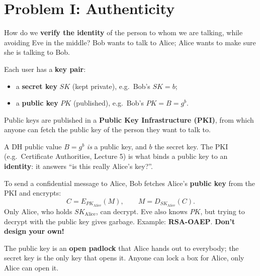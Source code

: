 \section{Problem I: Authenticity}

\begin{defnbox}[title=Authenticity]
How do we \textbf{verify the identity} of the person to whom we are talking, while
avoiding Eve in the middle? Bob wants to talk to Alice; Alice wants to make sure she is
talking to Bob.
\end{defnbox}

\begin{defnbox}[title=Public-key cryptography: key pairs and PKI]
Each user has a \textbf{key pair}:
\begin{itemize}
  \item a \textbf{secret key} $SK$ (kept private), e.g.\ Bob's $SK = b$;
  \item a \textbf{public key} $PK$ (published), e.g.\ Bob's $PK = B = g^b$.
\end{itemize}
Public keys are published in a \textbf{Public Key Infrastructure (PKI)}, from which
anyone can fetch the public key of the person they want to talk to.
\end{defnbox}

\begin{rembox}[title=Link with Diffie-Hellman]
A DH public value $B = g^b$ \emph{is} a public key, and $b$ the secret key. The PKI
(e.g.\ Certificate Authorities, Lecture 5) is what binds a public key to an
\textbf{identity}: it answers ``is this really Alice's key?''.
\end{rembox}

\begin{defnbox}[title=Public-key encryption (confidentiality)]
To send a confidential message to Alice, Bob fetches Alice's \textbf{public key} from the
PKI and encrypts:
\[
  C = E_{PK_{\text{Alice}}}(M), \qquad M = D_{SK_{\text{Alice}}}(C).
\]
Only Alice, who holds $SK_{\text{Alice}}$, can decrypt. Eve also knows $PK$, but trying to
decrypt with the public key gives garbage. Example: \textbf{RSA-OAEP}.
\textbf{Don't design your own!}
\end{defnbox}

\begin{rembox}[title=Intuition: the padlock]
The public key is an \textbf{open padlock} that Alice hands out to everybody; the secret
key is the only key that opens it. Anyone can lock a box for Alice, only Alice can open
it.
\end{rembox}

